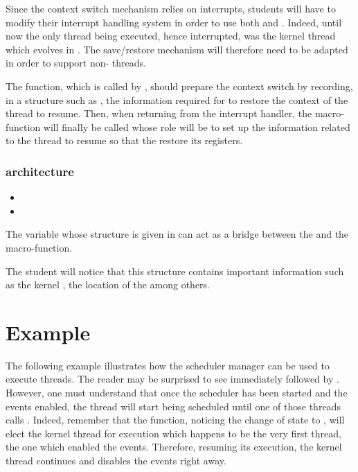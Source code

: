 Since the context switch mechanism relies on interrupts, students will
have to modify their interrupt handling system in order to use both
 and
. Indeed, until now the only thread
being executed, hence interrupted, was the kernel thread which evolves in
. The save/restore mechanism will therefore need to be adapted
in order to support non- threads.

The  function, which is called by
, should prepare the context switch by
recording, in a structure such as , the information
required for  to restore the context
of the thread to resume. Then, when returning from the interrupt handler,
the  macro-function will finally be
called whose role will be to set up the information related to the thread
to resume so that the  restore its registers.

\subsubsection*{architecture}

\begin{itemize}
  \item
  \item
\end{itemize}

The  variable whose structure is given in
 can act as a bridge between the
 and the
 macro-function.

The student will notice that this structure contains important information
such as the kernel , the location
of the  among others.

%
%

\section{Example}

The following example illustrates how the scheduler manager can be used
to execute threads. The reader may be surprised to see 
immediately followed by . However, one must understand
that once the scheduler has been started and the events enabled, the
thread will start being scheduled until one of those threads calls
. Indeed, remember that the 
function, noticing the change of state to , will
elect the kernel thread for execution which happens to be the very first
thread, the one which enabled the events. Therefore, resuming its execution,
the kernel thread continues and disables the events right away.

